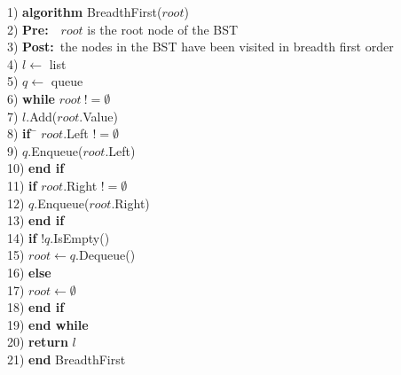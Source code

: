 \begin{tabbing}
1)  \textbf{alg}\= \textbf{orithm} BreadthFirst($root$) \\
2)  \> \textbf{Pre:}~~$root$ is the root node of the BST \\
3)  \> \textbf{Post:}~the nodes in the BST have been visited in breadth first order \\
4)  \> $l \leftarrow$ list \\
5)  \> $q \leftarrow$ queue \\
6)  \> \textbf{whi}\= \textbf{le} $root~!= \emptyset$ \\
7)  \> \> $l$.Add($root$.Value) \\
8)  \> \> \textbf{if}~\= $root$.Left $!= \emptyset$ \\
9)  \> \> \> $q$.Enqueue($root$.Left) \\
10) \> \> \textbf{end if} \\
11) \> \> \textbf{if} $root$.Right $!= \emptyset$ \\
12) \> \> \> $q$.Enqueue($root$.Right) \\
13) \> \> \textbf{end if} \\
14) \> \> \textbf{if} $!q$.IsEmpty() \\
15) \> \> \> $root \leftarrow q$.Dequeue() \\
16) \> \> \textbf{else} \\
17) \> \> \> $root \leftarrow \emptyset$ \\
18) \> \> \textbf{end if} \\
19) \> \textbf{end while} \\
20) \> \textbf{return} $l$ \\
21) \textbf{end} BreadthFirst \\
\end{tabbing}
